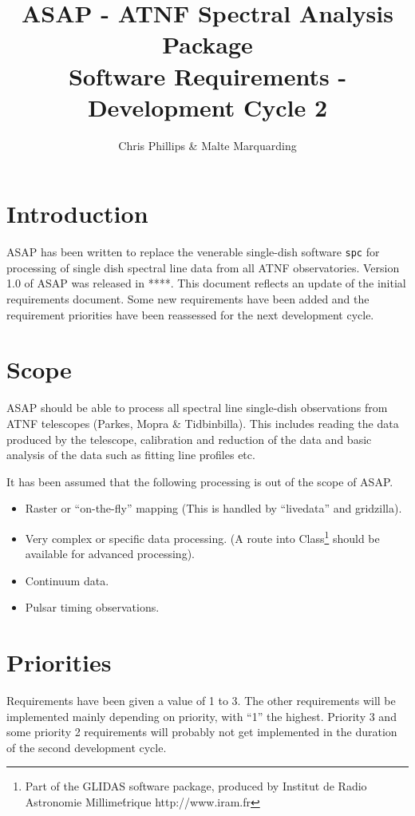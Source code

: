 \documentclass[11pt]{article}
\title{ASAP - ATNF Spectral Analysis Package\\
  Software Requirements - Development Cycle 2 }
\author{Chris Phillips \& Malte Marquarding}
\newcounter{requirement}
\let\oldsection\section
\renewcommand{\section}[1]{\setcounter{requirement}{0}\oldsection{#1}}
\begin{document}
\maketitle

\section{Introduction}

ASAP has been written to replace the venerable single-dish software
{\tt spc} for processing of single dish spectral line data from all
ATNF observatories. Version 1.0 of ASAP was released in ****. This
document reflects an update of the initial requirements document. Some
new requirements have been added and the requirement priorities have
been reassessed for the next development cycle.

\section{Scope}

ASAP should be able to process all spectral line single-dish
observations from ATNF telescopes (Parkes, Mopra \& Tidbinbilla). This
includes reading the data produced by the telescope, calibration and
reduction of the data and basic analysis of the data such as fitting
line profiles etc.

It has been assumed that the following processing is out of the scope
of ASAP.
\begin{itemize}
\item Raster or ``on-the-fly'' mapping (This is handled by
``livedata'' and gridzilla).
\item Very complex or specific data processing. (A route into
  Class\footnote{Part of the GLIDAS software package, produced by
  Institut de Radio Astronomie Millime\'trique http://www.iram.fr}
  should be available for advanced processing).
\item Continuum data.
\item Pulsar timing observations.
\end{itemize}

\section{Priorities}

Requirements have been given a value of 1 to 3. The other requirements
will be implemented mainly depending on priority, with ``1'' the
highest. Priority 3 and some priority 2 requirements will probably not
get implemented in the duration of the second development cycle.
\end{document}
